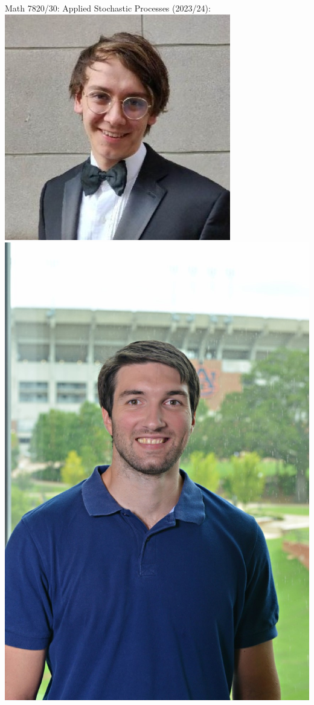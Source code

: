 \documentclass[9pt,table,xcolor=dvipsnames]{beamer}
\begin{document}
\begin{frame}[fragile] %
  \begin{center}
    Math 7820/30: Applied Stochastic Processes (2023/24):
    \includegraphics[scale=0.30]{./figs/mau.jpeg}
    \includegraphics[scale=0.50]{./figs/ruau.jpg}
    \bigskip


\end{center}
\end{frame}
\end{document}
